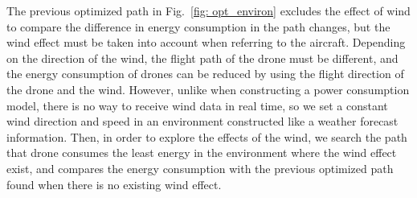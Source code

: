 \documentclass[journal]{./template/IEEEtran}
\begin{document}


The previous optimized path in Fig.~\ref{fig: opt_environ} excludes the effect of wind to compare the difference in energy consumption in the path changes, but the wind effect must be taken into account when referring to the aircraft.
Depending on the direction of the wind, the flight path of the drone must be different, and the energy consumption of drones can be reduced by using the flight direction of the drone and the wind.
However, unlike when constructing a power consumption model, there is no way to receive wind data in real time, so we set a constant wind direction and speed in an environment constructed like a weather forecast information.
Then, in order to explore the effects of the wind, we search the path that drone consumes the least energy in the environment where the wind effect exist, and compares the energy consumption with the previous optimized path found when there is no existing wind effect.
\end{document}
